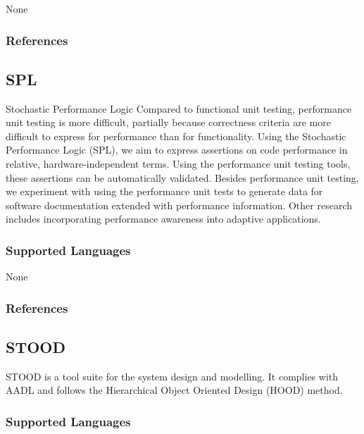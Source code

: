 None


\subsubsection{References}





\subsection{SPL}
\label{subsecT:SPL}


Stochastic Performance Logic
Compared to functional unit testing, performance unit testing is more difficult, partially because correctness criteria are more difficult to express for performance than for functionality. Using the Stochastic Performance Logic (SPL), we aim to express assertions on code performance in relative, hardware-independent terms. Using the performance unit testing tools, these assertions can be automatically validated. Besides performance unit testing, we experiment with using the performance unit tests to generate data for software documentation extended with performance information. Other research includes incorporating performance awareness into adaptive applications.

\subsubsection{Supported Languages}

None


\subsubsection{References}





\subsection{STOOD}
\label{subsecT:STOOD}


STOOD is a tool suite for the system design and modelling.
It complies with AADL and follows the Hierarchical Object Oriented Design (HOOD) method.

\subsubsection{Supported Languages}

